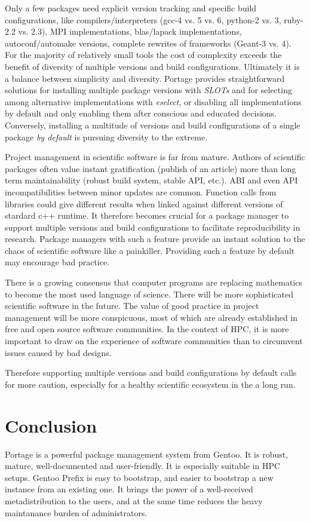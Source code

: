 \documentclass[a4paper,conference]{IEEEtran}
\begin{document}
Only a few packages need explicit version tracking and specific build
configurations, like compilers/interpreters (gcc-4 vs. 5 vs. 6,
python-2 vs. 3, ruby-2.2 vs. 2.3), MPI implementations, blas/lapack
implementations, autoconf/automake versions, complete rewrites of
frameworks (Geant-3 vs. 4). For the majority of relatively small tools
the cost of complexity exceeds the benefit of diversity of multiple
versions and build configurations. Ultimately it is a balance between
simplicity and diversity. Portage provides straightforward solutions
for installing multiple package versions with \emph{SLOTs} and for
selecting among alternative implementations with \emph{eselect}, or
disabling all implementations by default and only enabling them after
conscious and educated decisions.  Conversely, installing a multitude
of versions and build configurations of a single package \emph{by
  default} is pursuing diversity to the extreme.

Project management in scientific software is far from mature. Authors
of scientific packages often value instant gratification (publish of
an article) more than long term maintainability (robust build system,
stable API, etc.). ABI and even API incompatibilities between minor
updates are common. Function calls from libraries could give different
results when linked against different versions of stardard c++
runtime.  It therefore becomes crucial for a package manager to
support multiple versions and build configurations to facilitate
reproducibility in research. Package managers with such a feature
provide an instant solution to the chaos of scientific software like a
painkiller.  Providing such a feature by default may encourage bad
practice.

There is a growing consensus that computer programs are replacing
mathematics to become the most used language of science. There will be
more sophisticated scientific software in the future. The value of
good practice in project management will be more conspicuous, most of
which are already established in free and open source software
communities.  In the context of HPC, it is more important to draw on
the experience of software communities than to circumvent issues
caused by bad designs.

Therefore supporting multiple versions and build configurations by
default calls for more caution, especially for a healthy scientific
ecosystem in the a long run.

\section{Conclusion}
\label{sec:conclusion}
Portage is a powerful package management system from Gentoo. It is
robust, mature, well-documented and user-friendly. It is especially
suitable in HPC setups. Gentoo Prefix is easy to bootstrap, and
easier to bootstrap a new instance from an existing one. It brings
the power of a well-received metadistribution to the users, and at the
same time reduces the heavy maintanance burden of administrators.
\end{document}
